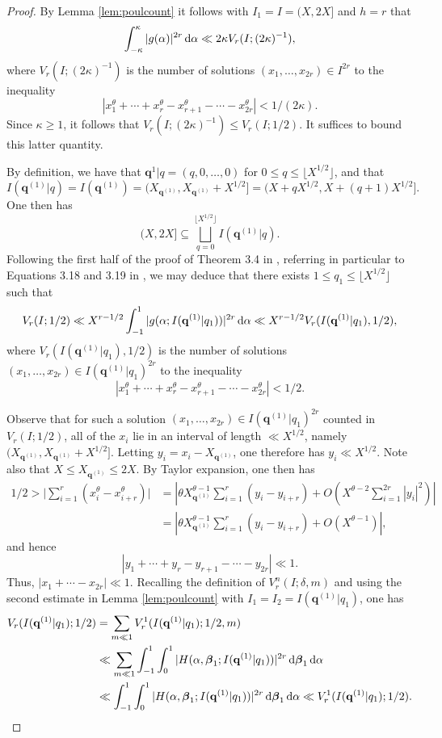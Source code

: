 \documentclass[11pt,reqno]{amsart}
\numberwithin{equation}{section}
\renewcommand{\d}{\,{\rm d}}
\begin{document}
\begin{proof} By Lemma \ref{lem:poulcount} it follows with $I_1=I = (X,2X]$ and $h = r$ that 
\[ \int_{-\kappa}^{\kappa} |g(\alpha)|^{2r} \d\alpha \ll 2\kappa V_{r}(I; (2\kappa)^{-1}), \]
where $V_{r}(I; (2\kappa)^{-1})$ is the number of solutions $(x_1,\ldots,x_{2r})\in I^{2r}$ to the inequality 
\[ |x_1^{\theta}+\cdots+x_r^{\theta}-x_{r+1}^{\theta}-\cdots-x_{2r}^{\theta}|<1/(2\kappa). \]
Since $\kappa \geq 1$, it follows that $V_{r}(I; (2\kappa)^{-1}) \leq V_{r}(I; 1/2)$. It suffices to bound this latter quantity. 

By definition, we have that $\mathbf{q}^{1}|q = (q,0,\ldots,0)$ for $0 \leq q \leq \lfloor X^{1/2}\rfloor$, and that 
\[ I(\mathbf{q}^{(1)}|q) = I(\mathbf{q}^{(1)}) = (X_{\mathbf{q}^{(1)}}, X_{\mathbf{q}^{(1)}}+X^{1/2}] = (X+qX^{1/2},X+(q+1)X^{1/2}]. \]
One then has 
\[ (X,2X] \subseteq \bigsqcup_{q=0}^{\lfloor X^{1/2} \rfloor} I({\mathbf{q}^{(1)}|q}). \]
Following the first half of the proof of Theorem 3.4 in \cite{Poulias1}, referring in particular to Equations 3.18 and 3.19 in \cite{Poulias1}, we may deduce that there exists $1 \leq q_1 \leq \lfloor X^{1/2}\rfloor$
such that 
\[ V_{r}(I; 1/2) \ll X^{r-1/2} \int_{-1}^{1} |g(\alpha; I(\mathbf{q}^{(1)}|q_1))|^{2r} \d\alpha \ll X^{r-1/2} V_r(I(\mathbf{q}^{(1)}|q_1),1/2), \]
where $V_r(I(\mathbf{q}^{(1)}|q_1),1/2)$ is the number of solutions $(x_1,\ldots,x_{2r}) \in I(\mathbf{q}^{(1)}|q_1)^{2r}$ to the inequality 
\[ |x_1^{\theta}+\cdots+x_r^{\theta}-x_{r+1}^{\theta}-\cdots-x_{2r}^{\theta}|<1/2. \]

Observe that for such a solution $(x_1,\ldots,x_{2r}) \in I(\mathbf{q}^{(1)}|q_1)^{2r}$ counted in $V_r(I;1/2)$, all of the $x_i$ lie in an interval of length $\ll X^{1/2}$, namely $(X_{\mathbf{q}^{(1)}}, X_{\mathbf{q}^{(1)}}+X^{1/2}]$. Letting $y_i = x_i - X_{\mathbf{q}^{(1)}}$, one therefore has $y_i \ll X^{1/2}$. Note also that $X \leq X_{\mathbf{q}^{(1)}} \leq 2X$. By Taylor expansion, one then has 
\begin{align*} 
1/2 > \Big| \sum_{i=1}^r (x_i^{\theta}-x_{i+r}^{\theta})\Big| & = | \theta X_{\mathbf{q}^{(1)}}^{\theta-1} \sum_{i=1}^r(y_i-y_{i+r})+ O(X^{\theta-2} \sum_{i=1}^{2r} |y_i|^2)| 
\\ & = | \theta X_{\mathbf{q}^{(1)}}^{\theta-1} \sum_{i=1}^r(y_i-y_{i+r})+ O(X^{\theta-1})|,
\end{align*}
and hence 
\[ |y_1+\cdots+y_r-y_{r+1}-\cdots-y_{2r}| \ll 1.\]
Thus, $|x_1+\cdots-x_{2r}| \ll 1$. Recalling the definition of $V_r^n(I;\delta,m)$ and using the second estimate in Lemma \ref{lem:poulcount} with $I_1 = I_2 = I(\mathbf{q}^{(1)}|q_1)$, one has 
\begin{align*} 
V_r(I(\mathbf{q}^{(1)}|q_1);1/2) & = \sum_{m \ll 1} V_{r}^1(I(\mathbf{q}^{(1)}|q_1); 1/2,m) 
\\ 
& \ll \sum_{m \ll 1} \int_{-1}^{1} \int_0^1 |H(\alpha,\boldsymbol{\beta}_1; I(\mathbf{q}^{(1)}|q_1) )|^{2r} \d \boldsymbol{\beta}_1 \d \alpha 
\\ 
& \ll \int_{-1}^{1} \int_0^1 | H(\alpha,\boldsymbol{\beta}_1;I(\mathbf{q}^{(1)}|q_1) )|^{2r} \d \boldsymbol{\beta}_1 \d \alpha \ll V_{r}^1( I(\mathbf{q}^{(1)}|q_1);1/2). 
\end{align*}


\end{proof}
\end{document}
